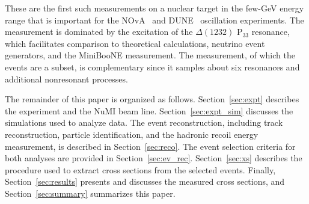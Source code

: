 These are the first such measurements on a nuclear target in the few-GeV energy range that is important for the NOvA~\cite{Ayres:2004js} and DUNE~\cite{LBNE} oscillation 
experiments. The \cconepi
measurement is dominated by the excitation of the $\Delta(1232)$ P$_{33}$ resonance, which facilitates comparison 
to theoretical calculations, neutrino event generators, and the MiniBooNE measurement.  The \ccpi measurement, of which the \cconepi events 
are a subset, is complementary since it samples about six resonances and additional nonresonant processes.

The remainder of this paper is organized as follows.  Section~\ref{sec:expt} describes the \minerva experiment and the NuMI beam line.  
Section~\ref{sec:expt_sim} discusses the simulations used to analyze data.  The event reconstruction, including 
track reconstruction, particle identification, and the hadronic recoil energy measurement, is described in Section~\ref{sec:reco}.  The event selection 
criteria for both analyses are provided in Section~\ref{sec:ev_rec}.  Section~\ref{sec:xs} describes the procedure used to extract cross sections 
from the selected events.  Finally, Section~\ref{sec:results} presents 
and discusses the measured cross sections, and Section~\ref{sec:summary} summarizes this paper.



